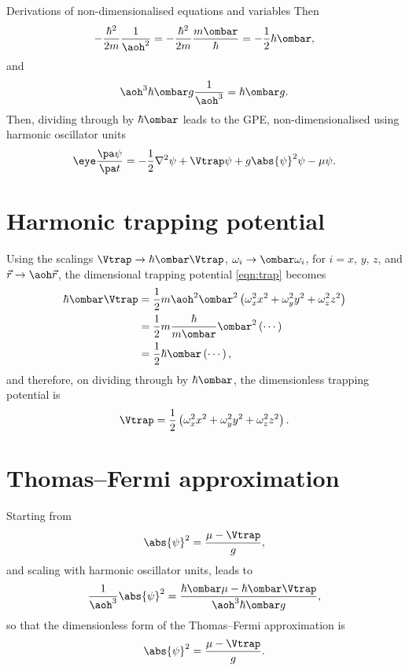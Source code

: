 \begin{chapter}{\label{cha:nondim}Derivations of non-dimensionalised equations
and variables}
  Then
  \begin{equation*}
    -\frac{\hbar^{2}}{2m} \frac{1}{\aoh^{2}} = -\frac{\hbar^{2}}{2m}
    \frac{m\ombar}{\hbar} = -\frac{1}{2} \hbar \ombar,
  \end{equation*}
  and
  \begin{equation*}
    \aoh^{3} \hbar \ombar g \frac{1}{\aoh^{3}} = \hbar \ombar g.
  \end{equation*}
  Then, dividing through by $\hbar \ombar$ leads to the GPE,
  non-dimensionalised using harmonic oscillator units
  \begin{equation*}
    \eye \frac{\pa \psi}{\pa t} = -\frac{1}{2}\nabla^{2}\psi + \Vtrap\psi +
    g\abs{\psi}^{2}\psi - \mu\psi.
  \end{equation*}

  \section{Harmonic trapping potential}
  Using the scalings $\Vtrap \to \hbar \ombar \Vtrap$,  $\omega_{i} \to \ombar
  \omega_{i}$, for $i=x$, $y$, $z$, and $\vec{r} \to \aoh \vec{r}$, the
  dimensional trapping potential \eqref{eqn:trap} becomes
  \begin{equation*}
    \begin{aligned}
      \hbar \ombar \Vtrap &= \frac{1}{2} m \aoh^{2} \ombar^{2} \left(
      \omega_{x}^{2} x^{2} + \omega_{y}^{2} y^{2} + \omega_{z}^{2} z^{2}
      \right) \\
      &= \frac{1}{2} m \frac{\hbar}{m \ombar} \ombar^{2} \left( \cdots \right)
      \\
      &= \frac{1}{2} \hbar \ombar \left( \cdots \right),
    \end{aligned}
  \end{equation*}
  and therefore, on dividing through by $\hbar \ombar$, the dimensionless
  trapping potential is
  \begin{equation*}
    \Vtrap = \frac{1}{2} \left( \omega_{x}^{2} x^{2} + \omega_{y}^{2} y^{2} +
    \omega_{z}^{2} z^{2} \right).
  \end{equation*}

  \section{Thomas--Fermi approximation}
  Starting from
  \begin{equation*}
    \abs{\psi}^{2} = \frac{\mu - \Vtrap}{g},
  \end{equation*}
  and scaling with harmonic oscillator units, leads to
  \begin{equation*}
    \frac{1}{\aoh^{3}} \abs{\psi}^{2} = \frac{\hbar \ombar \mu - \hbar \ombar
    \Vtrap}{\aoh^{3} \hbar \ombar g},
  \end{equation*}
  so that the dimensionless form of the Thomas--Fermi approximation is
  \begin{equation*}
    \abs{\psi}^{2} = \frac{\mu - \Vtrap}{g}.
  \end{equation*}


\end{chapter}
